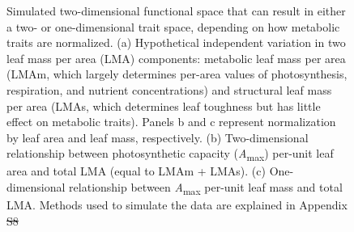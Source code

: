 \documentclass[
  12pt,
  letterpaper,
  DIV=11,
  numbers=noendperiod]{scrartcl}
\providecommand{\DIFadd}[1]{{\protect\color{blue}\uwave{#1}}} %
\providecommand{\DIFdel}[1]{{\protect\color{red}\sout{#1}}}                      %
\providecommand{\DIFaddFL}[1]{\DIFadd{#1}} %
\providecommand{\DIFdelFL}[1]{\DIFdel{#1}} %
\providecommand{\DIFaddbeginFL}{} %
\providecommand{\DIFaddendFL}{} %
\providecommand{\DIFdelbeginFL}{} %
\providecommand{\DIFdelendFL}{} %
\newcommand{\DIFscaledelfig}{0.5}
\newlength{\DIFdelgraphicswidth} %
\newlength{\DIFdelgraphicsheight} %
\newcommand{\DIFaddincludegraphics}[2][]{{\color{blue}\fbox{\DIFOincludegraphics[#1]{#2}}}} %
\newcommand{\DIFdelincludegraphics}[2][]{%
\sbox{\DIFdelgraphicsbox}{\DIFOincludegraphics[#1]{#2}}%
\settoboxwidth{\DIFdelgraphicswidth}{\DIFdelgraphicsbox} %
\settoboxtotalheight{\DIFdelgraphicsheight}{\DIFdelgraphicsbox} %
\scalebox{\DIFscaledelfig}{%
\parbox[b]{\DIFdelgraphicswidth}{\usebox{\DIFdelgraphicsbox}\\[-\baselineskip] \rule{\DIFdelgraphicswidth}{0em}}\llap{\resizebox{\DIFdelgraphicswidth}{\DIFdelgraphicsheight}{%
\setlength{\unitlength}{\DIFdelgraphicswidth}%
\begin{picture}(1,1)%
\thicklines\linethickness{2pt} %
{\color[rgb]{1,0,0}\put(0,0){\framebox(1,1){}}}%
{\color[rgb]{1,0,0}\put(0,0){\line( 1,1){1}}}%
{\color[rgb]{1,0,0}\put(0,1){\line(1,-1){1}}}%
\end{picture}%
}\hspace*{3pt}}} %
} %
\DeclareRobustCommand{\DIFaddbeginFL}{\DIFOaddbeginFL \let\includegraphics\DIFaddincludegraphics} %
\DeclareRobustCommand{\DIFaddendFL}{\DIFOaddendFL \let\includegraphics\DIFOincludegraphics} %
\DeclareRobustCommand{\DIFdelbeginFL}{\DIFOdelbeginFL \let\includegraphics\DIFdelincludegraphics} %
\DeclareRobustCommand{\DIFdelendFL}{\DIFOaddendFL \let\includegraphics\DIFOincludegraphics} %
\begin{document}
\begin{figure}


\caption{\label{fig-hypo}Simulated two-dimensional functional space that
can result in either a two- or one-dimensional trait space, depending on
how metabolic traits are normalized. (a) Hypothetical independent
variation in two leaf mass per area (LMA) components: metabolic leaf
mass per area (LMAm, which largely determines per-area values of
photosynthesis, respiration, and nutrient concentrations) and structural
leaf mass per area (LMAs, which determines leaf toughness but has little
effect on metabolic traits). Panels b and c represent normalization by
leaf area and leaf mass, respectively. (b) Two-dimensional relationship
between photosynthetic capacity (\emph{A}\textsubscript{max}) per-unit
leaf area and total LMA (equal to LMAm + LMAs). (c) One-dimensional
relationship between \emph{A}\textsubscript{max} per-unit leaf mass and
total LMA. Methods used to simulate the data are explained in Appendix
\DIFdelbeginFL \DIFdelFL{S8}\DIFdelendFL \DIFaddbeginFL \DIFaddFL{S6.}\DIFaddendFL }

\end{figure}%

\newpage
\end{document}
